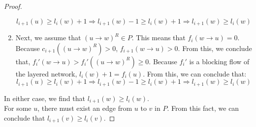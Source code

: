 \documentclass{report}
\begin{document}
\begin{proof}
\begin{enumerate}
                $$l_{i+1}(u) \ge l_i(w) + 1 \Rightarrow l_{i+1}(w) - 1 \ge l_i(w) + 1 \Rightarrow l_{i+1}(w) \ge l_i(w)$$
            \item
                Next, we assume that $(u \rightarrow w)^R \in P$. This means that $f_i(w \rightarrow u) = 0$. Because $c_{i+1}((u \rightarrow w)^R) > 0$, $f_{i+1}(w \rightarrow u) > 0$. From this, we conclude that, $f_i'(w \rightarrow u) > f_i'((u \rightarrow w)^R) \ge 0$. Because $f_i'$ is a blocking flow of the layered network, $l_i(w) + 1 = f_i(u)$. From this, we can conclude that:
                $$l_{i+1}(u) \ge l_i(w) + 1 \Rightarrow l_{i+1}(w) - 1 \ge l_i(w) + 1 \Rightarrow l_{i+1}(w) \ge l_i(w)$$
        \end{enumerate}
        In either case, we find that $l_{i+1}(w) \ge l_i(w)$.\\
    For some $u$, there must exist an edge from $u$ to $v$ in $P$. From this fact, we can conclude that $l_{i+1}(v) \ge l_i(v)$.
\end{proof}
\end{document}
